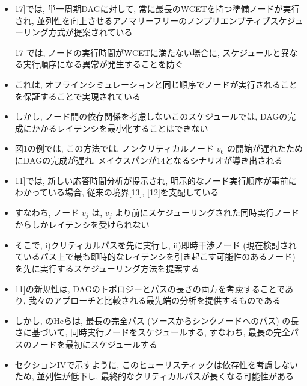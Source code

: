 \begin{frame}{}
    \begin{itemize}
        \item 17]では, 単一周期DAGに対して, 常に最長のWCETを持つ準備ノードが実行され, 並列性を向上させるアノマリーフリーのノンプリエンプティブスケジューリング方式が提案されている
        \item [17]では, ノードの実行時間がWCETに満たない場合に, スケジュールと異なる実行順序になる異常が発生することを防ぐ
        \item これは, オフラインシミュレーションと同じ順序でノードが実行されることを保証することで実現されている
        \item しかし, ノード間の依存関係を考慮しないこのスケジュールでは, DAGの完成にかかるレイテンシを最小化することはできない
        \item 図1の例では, この方法では, ノンクリティカルノード $v_{6}$ の開始が遅れたためにDAGの完成が遅れ, メイクスパンが14となるシナリオが導き出される
    \end{itemize}
\end{frame}

\begin{frame}{}
    \begin{itemize}
        \item 11]では, 新しい応答時間分析が提示され, 明示的なノード実行順序が事前にわかっている場合, 従来の境界[13], [12]を支配している
        \item すなわち, ノード $v_{j}$ は, $v_{j}$ より前にスケジューリングされた同時実行ノードからしかレイテンシを受けられない
        \item そこで, i)クリティカルパスを先に実行し, ii)即時干渉ノード (現在検討されているパス上で最も即時的なレイテンシを引き起こす可能性のあるノード) を先に実行するスケジューリング方法を提案する
    \end{itemize}
\end{frame}

\begin{frame}{}
    \begin{itemize}
        \item 11]の新規性は, DAGのトポロジーとパスの長さの両方を考慮することであり, 我々のアプローチと比較される最先端の分析を提供するものである
        \item しかし, \cite{he2019intra}のHeらは, 最長の完全パス (ソースからシンクノードへのパス) の長さに基づいて, 同時実行ノードをスケジュールする, すなわち, 最長の完全パスのノードを最初にスケジュールする
        \item セクションIVで示すように, このヒューリスティックは依存性を考慮しないため, 並列性が低下し, 最終的なクリティカルパスが長くなる可能性がある
    \end{itemize}
\end{frame}
